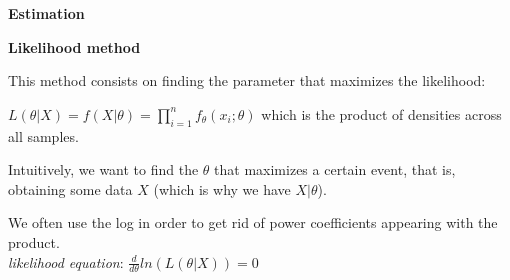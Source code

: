 {\fontsize{20pt}{22pt}\selectfont \textbf{Estimation} \par}

\vspace{20mm}

{\fontsize{12pt}{22pt} \textbf{Likelihood method}\par}

\vspace{5mm}

This method consists on finding the parameter that maximizes the likelihood:

$L(\theta | X) = f(X | \theta) = \prod_{i=1}^{n}f_{\theta}(x_i;\theta)$ which is the product of densities across all samples.

\vspace{5mm}

Intuitively, we want to find the $\theta$ that maximizes a certain event, that is, obtaining some data $X$ (which is why we have $X | \theta$).

We often use the log in order to get rid of power coefficients appearing with the product. \\
\textit{likelihood equation}: $\frac{d}{d\theta}ln(L(\theta | X))=0$